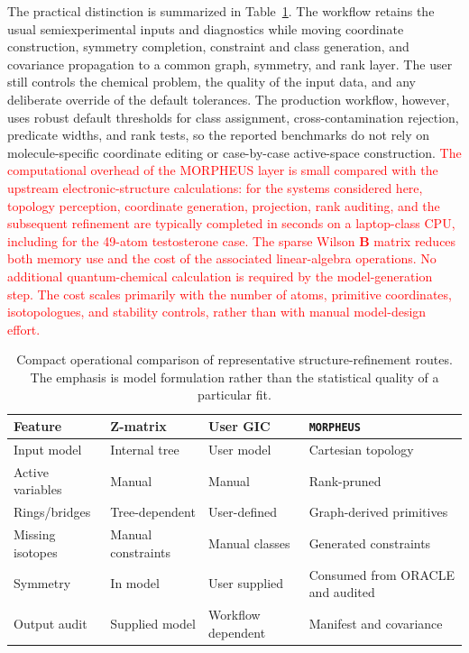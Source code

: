 \documentclass[aip,jcp,reprint,longbibliography,floatfix]{revtex4-2}
\newcommand{\rev}[1]{\textcolor{red}{#1}}
\begin{document}
The practical distinction is summarized in Table~\ref{tab:workflow-comparison}.
The workflow retains the usual semiexperimental inputs and diagnostics while
moving coordinate construction, symmetry completion, constraint and class
generation, and covariance propagation to a common graph, symmetry, and rank
layer. The user still controls the chemical problem, the quality of the input
data, and any deliberate override of the default tolerances. The production
workflow, however, uses robust default thresholds for class assignment,
cross-contamination rejection, predicate widths, and rank tests, so the
reported benchmarks do not rely on molecule-specific coordinate editing or
case-by-case active-space construction.
\rev{The computational overhead of the MORPHEUS layer is small compared with
the upstream electronic-structure calculations: for the systems considered
here, topology perception, coordinate generation, projection, rank auditing,
and the subsequent refinement are typically completed in seconds on a
laptop-class CPU, including for the 49-atom testosterone case. The sparse
Wilson $\mathbf{B}$ matrix reduces both memory use and the cost of the
associated linear-algebra operations. No additional quantum-chemical
calculation is required by the model-generation step. The cost scales
primarily with the number of atoms, primitive coordinates, isotopologues, and
stability controls, rather than with manual model-design effort.}

\begin{table}
\caption{Compact operational comparison of representative
structure-refinement routes. The emphasis is model formulation rather than the
statistical quality of a particular fit.}
\label{tab:workflow-comparison}
\footnotesize
\setlength{\tabcolsep}{5pt}
\begin{tabular}{@{}llll@{}}
\toprule
Feature & Z-matrix & User GIC & \texttt{MORPHEUS} \\
\midrule
Input model & Internal tree & User model & Cartesian topology \\
Active variables & Manual & Manual & Rank-pruned \\
Rings/bridges & Tree-dependent & User-defined & Graph-derived primitives \\
Missing isotopes & Manual constraints & Manual classes & Generated constraints \\
Symmetry & In model & User supplied & Consumed from ORACLE and audited \\
Output audit & Supplied model & Workflow dependent & Manifest and covariance \\
\bottomrule
\end{tabular}
\end{table}
\end{document}
